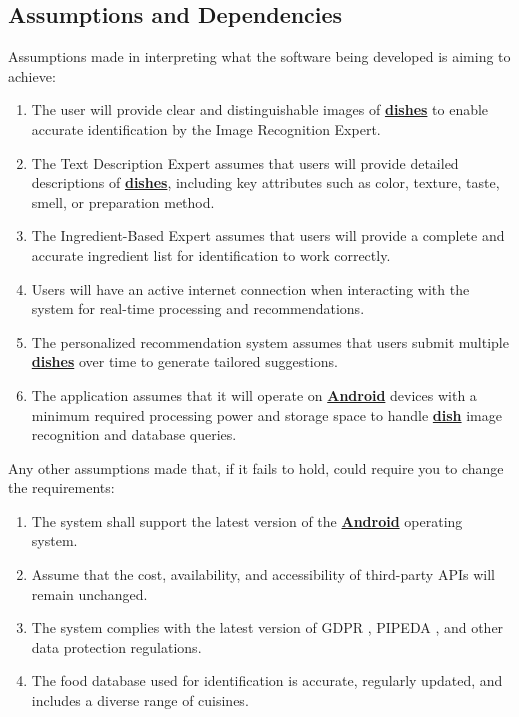 \documentclass[]{article}
\begin{document}
\subsection{Assumptions and Dependencies}
\label{sub:assumptions_and_dependencies}
Assumptions made in interpreting what the software being developed is aiming to achieve:
	\begin{enumerate}
		\item The user will provide clear and distinguishable images of \hyperref[Dish]{\textbf{dishes}} to enable accurate identification by the Image Recognition Expert.
		\item The Text Description Expert assumes that users will provide detailed descriptions of \hyperref[Dish]{\textbf{dishes}}, including key attributes such as color, texture, taste, smell, or preparation method.
		\item The Ingredient-Based Expert assumes that users will provide a complete and accurate ingredient list for identification to work correctly.
		\item Users will have an active internet connection when interacting with the system for real-time processing and recommendations.
		\item The personalized recommendation system assumes that users submit multiple \hyperref[Dish]{\textbf{dishes}} over time to generate tailored suggestions.
		\item The application assumes that it will operate on \hyperref[Android]{\textbf{Android}} devices with a minimum required processing power and storage space to handle \hyperref[Dish]{\textbf{dish}} image recognition and database queries.
	\end{enumerate}

Any other assumptions made that, if it fails to hold, could require you to change the requirements:
	\begin{enumerate}
		\item The system shall support the latest version of the \hyperref[Android]{\textbf{Android}} operating system.
		\item Assume that the cost, availability, and accessibility of third-party APIs will remain unchanged.
		\item The system complies with the latest version of GDPR \cite{GDPR}, PIPEDA \cite{PIPEDA1}, and other data protection regulations.
		\item The food database used for identification is accurate, regularly updated, and includes a diverse range of cuisines.
	\end{enumerate}
\end{document}
